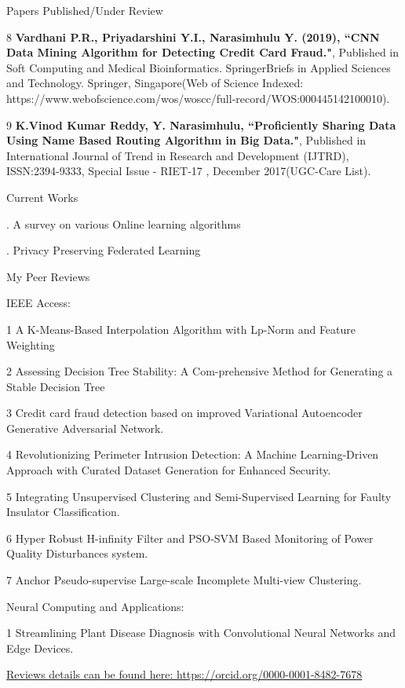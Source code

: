 \documentclass{resume} %
\begin{document}
\begin{rSection}{Papers Published/Under Review}
\begin{rSubsection}{}{}{}{}
		\item[8] \textbf{Vardhani P.R., Priyadarshini Y.I., Narasimhulu Y. (2019), ``CNN Data Mining Algorithm for Detecting Credit Card Fraud."}, Published in Soft Computing and Medical Bioinformatics. SpringerBriefs in Applied Sciences and Technology. Springer, Singapore(Web of Science Indexed: https://www.webofscience.com/wos/woscc/full-record/WOS:000445142100010).
		
		\item[9] \textbf{K.Vinod Kumar Reddy, Y. Narasimhulu, ``Proficiently Sharing Data Using Name Based Routing Algorithm in Big Data."}, Published in International Journal of Trend in Research and Development (IJTRD), ISSN:2394-9333, Special Issue - RIET-17 , December 2017(UGC-Care List).
	\end{rSubsection}
	
	
\end{rSection}

\begin{rSection}{Current Works}
	
	\begin{rSubsection}{}{}{}{}	
		\item[.] A survey on various Online learning algorithms
		\item[.] Privacy Preserving Federated Learning
	\end{rSubsection}
\end{rSection}


\begin{rSection}{My Peer Reviews}
	
	\begin{rSubsection}{IEEE Access:}{}{}{}	
		\item[1] A K-Means-Based Interpolation Algorithm with Lp-Norm and Feature Weighting
		\item[2] Assessing Decision Tree Stability: A Com-prehensive Method for Generating a Stable Decision Tree
		\item[3] Credit card fraud detection based on improved Variational Autoencoder Generative Adversarial Network.
		\item[4] Revolutionizing Perimeter Intrusion Detection: A Machine Learning-Driven Approach with Curated Dataset Generation for Enhanced Security.
		\item[5] Integrating Unsupervised Clustering and Semi-Supervised
		Learning for Faulty Insulator Classification.
		\item[6] Hyper Robust H-infinity Filter and PSO-SVM Based Monitoring of Power Quality Disturbances system.
		\item[7] Anchor Pseudo-supervise Large-scale Incomplete Multi-view Clustering.
	\end{rSubsection}
	\begin{rSubsection}{Neural Computing and Applications:}{}{}{}		
		\item[1] Streamlining Plant Disease Diagnosis with Convolutional Neural Networks and Edge	Devices.
	\end{rSubsection}
	\href{https://orcid.org/0000-0001-8482-7678}{Reviews details can be found here: https://orcid.org/0000-0001-8482-7678}
\end{rSection}
\end{document}
